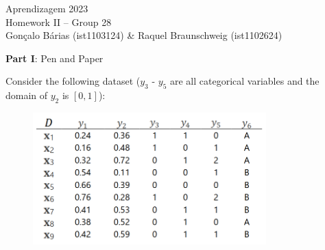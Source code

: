 \documentclass[12pt]{article}
\begin{document}
\begin{center}
\large{Aprendizagem 2023}\\
Homework II -- Group 28\\
\vskip 0.3cm
Gonçalo Bárias (ist1103124) \& Raquel Braunschweig (ist1102624)\vskip 1cm

\large{\textbf{Part I}: Pen and Paper}\normalsize
\end{center}

\noindent Consider the following dataset ($y_3$ - $y_5$ are all categorical variables and the domain of $y_2$ is $[0,1]$):

\begin{figure}[H]
    \centering
    \includegraphics[width=9cm]{./assets/dataset_d.png}
    \label{fig:PartI-dataset-d}
\end{figure}
\end{document}
